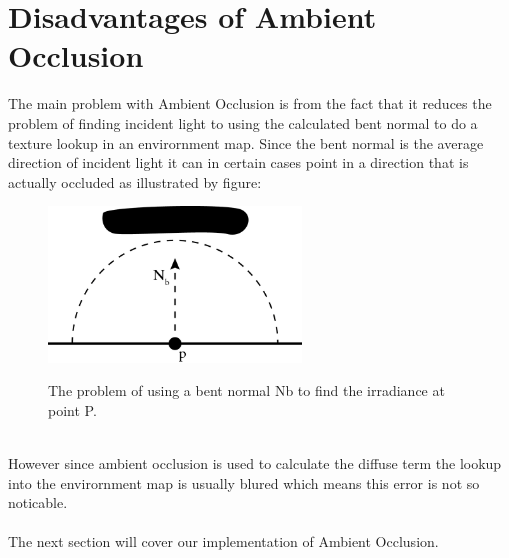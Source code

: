 \section{Disadvantages of Ambient Occlusion}
The main problem with Ambient Occlusion is from the fact that it reduces the problem of finding incident light to using the calculated bent normal to do a texture lookup in an envirornment map. Since the bent normal is the average direction of incident light it can in certain cases point in a direction that is actually occluded as illustrated by figure:
\\
\begin{figure}[h]
	\centering
	\includegraphics[width=0.6\textwidth]{Theory/bentNormalProblems}
	\label{fig:bent_normal}
	\caption{The problem of using a bent normal Nb to find the irradiance at point P.}
\end{figure}
\\
However since ambient occlusion is used to calculate the diffuse term the lookup into the envirornment map is usually blured which means this error is not so noticable.
\\ \\
The next section will cover our implementation of Ambient Occlusion.